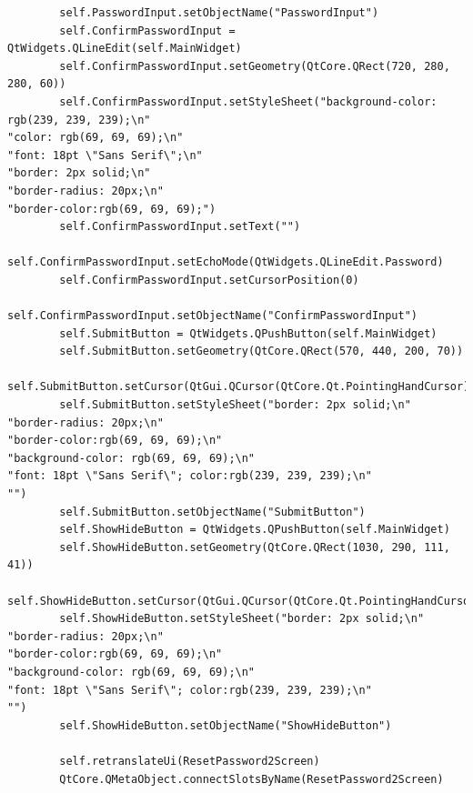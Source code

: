 \documentclass{article}
\begin{document}
\begin{lstlisting}
        self.PasswordInput.setObjectName("PasswordInput")
        self.ConfirmPasswordInput = QtWidgets.QLineEdit(self.MainWidget)
        self.ConfirmPasswordInput.setGeometry(QtCore.QRect(720, 280, 280, 60))
        self.ConfirmPasswordInput.setStyleSheet("background-color: rgb(239, 239, 239);\n"
"color: rgb(69, 69, 69);\n"
"font: 18pt \"Sans Serif\";\n"
"border: 2px solid;\n"
"border-radius: 20px;\n"
"border-color:rgb(69, 69, 69);")
        self.ConfirmPasswordInput.setText("")
        self.ConfirmPasswordInput.setEchoMode(QtWidgets.QLineEdit.Password)
        self.ConfirmPasswordInput.setCursorPosition(0)
        self.ConfirmPasswordInput.setObjectName("ConfirmPasswordInput")
        self.SubmitButton = QtWidgets.QPushButton(self.MainWidget)
        self.SubmitButton.setGeometry(QtCore.QRect(570, 440, 200, 70))
        self.SubmitButton.setCursor(QtGui.QCursor(QtCore.Qt.PointingHandCursor))
        self.SubmitButton.setStyleSheet("border: 2px solid;\n"
"border-radius: 20px;\n"
"border-color:rgb(69, 69, 69);\n"
"background-color: rgb(69, 69, 69);\n"
"font: 18pt \"Sans Serif\"; color:rgb(239, 239, 239);\n"
"")
        self.SubmitButton.setObjectName("SubmitButton")
        self.ShowHideButton = QtWidgets.QPushButton(self.MainWidget)
        self.ShowHideButton.setGeometry(QtCore.QRect(1030, 290, 111, 41))
        self.ShowHideButton.setCursor(QtGui.QCursor(QtCore.Qt.PointingHandCursor))
        self.ShowHideButton.setStyleSheet("border: 2px solid;\n"
"border-radius: 20px;\n"
"border-color:rgb(69, 69, 69);\n"
"background-color: rgb(69, 69, 69);\n"
"font: 18pt \"Sans Serif\"; color:rgb(239, 239, 239);\n"
"")
        self.ShowHideButton.setObjectName("ShowHideButton")

        self.retranslateUi(ResetPassword2Screen)
        QtCore.QMetaObject.connectSlotsByName(ResetPassword2Screen)


\end{lstlisting}
\end{document}
